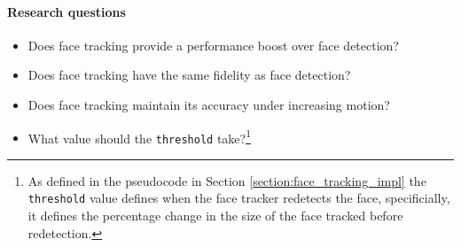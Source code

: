 \paragraph{Research questions}
\begin{itemize}
    \item Does face tracking provide a performance boost over face detection?
    \item Does face tracking have the same fidelity as face detection?
    \item Does face tracking maintain its accuracy under increasing motion?
    \item What value should the \texttt{threshold} take?\footnote{As defined in the pseudocode in Section \ref{section:face_tracking_impl} the \texttt{threshold} value defines when the face tracker redetects the face, specificially, it defines the percentage change in the size of the face tracked before redetection. }
\end{itemize}
